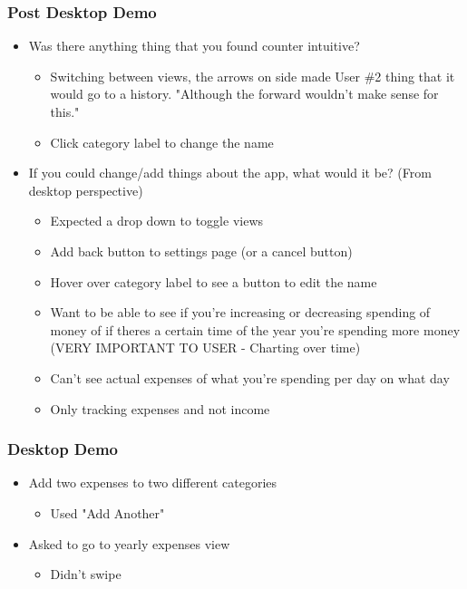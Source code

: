 \documentclass{chi2011}
\begin{document}
\begin{itemize}[noitemsep]
	\subsubsection{Post Desktop Demo}
	\begin{itemize}[noitemsep]
		\item Was there anything thing that you found counter intuitive?
		\begin{itemize}[noitemsep]
			\item Switching between views, the arrows on side made User \#2 thing that it would go to a 
			history. "Although the forward wouldn't make sense for this."
			\item Click category label to change the name
		\end{itemize}
		\item If you could change/add things about the app, what would it be? (From desktop perspective)
		\begin{itemize}[noitemsep]
			\item Expected a drop down to toggle views
			\item Add back button to settings page (or a cancel button)
			\item Hover over category label to see a button to edit the name
			\item Want to be able to see if you're increasing or decreasing spending of money of if theres a 
			  certain time of the year you're spending more money (VERY IMPORTANT TO USER - Charting
			  over time)
			\item Can't see actual expenses of what you're spending per day on what day
			\item Only tracking expenses and not income
		\end{itemize}
	\end{itemize}
	
	
	\subsubsection{Desktop Demo}
	\begin{itemize}[noitemsep] 
		\item Add two expenses to two different categories
		\begin{itemize}[noitemsep]
			\item Used "Add Another"
		\end{itemize}
	\item Asked to go to yearly expenses view
		\begin{itemize}[noitemsep]
			\item Didn't swipe
		\end{itemize}
	\end{itemize}


\end{itemize}
\end{document}
